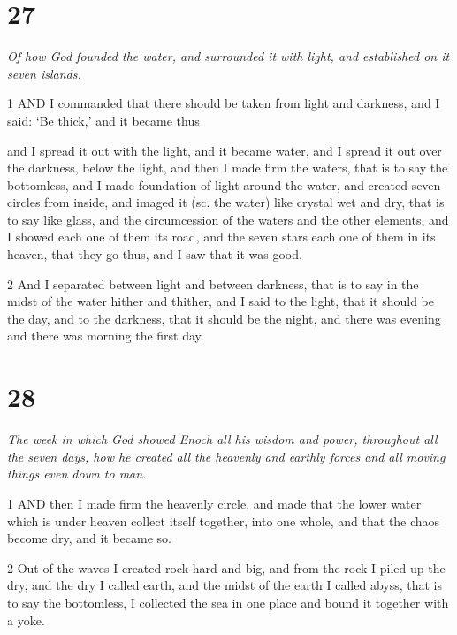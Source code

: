 \chapter{27}

\par \textit{Of how God founded the water, and surrounded it with light, and established on it seven islands.}

\par 1 AND I commanded that there should be taken from light and darkness, and I said: ‘Be thick,’ and it became thus

and I spread it out with the light, and it became water, and I spread it out over the darkness, below the light, and then I made firm the waters, that is to say the bottomless, and I made foundation of light around the water, and created seven circles from inside, and imaged it (sc. the water) like crystal wet and dry, that is to say like glass, and the circumcession of the waters and the other elements, and I showed each one of them its road, and the seven stars each one of them in its heaven, that they go thus, and I saw that it was good.

\par 2 And I separated between light and between darkness, that is to say in the midst of the water hither and thither, and I said to the light, that it should be the day, and to the darkness, that it should be the night, and there was evening and there was morning the first day.

\chapter{28}

\par \textit{The week in which God showed Enoch all his wisdom and power, throughout all the seven days, how he created all the heavenly and earthly forces and all moving things even down to man.}

\par 1 AND then I made firm the heavenly circle, and made that the lower water which is under heaven collect itself together, into one whole, and that the chaos become dry, and it became so.

\par 2 Out of the waves I created rock hard and big, and from the rock I piled up the dry, and the dry I called earth, and the midst of the earth I called abyss, that is to say the bottomless, I collected the sea in one place and bound it together with a yoke.

